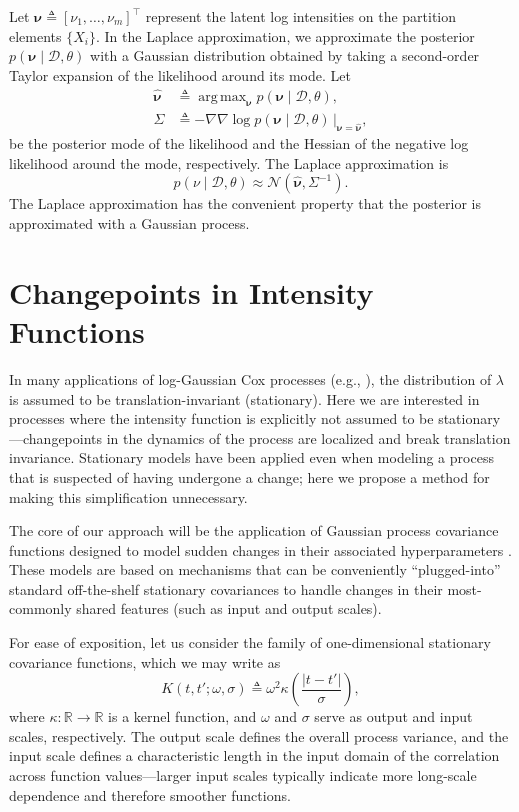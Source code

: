 \documentclass{article}
\newcommand{\deq}{\triangleq}
\newcommand{\cm}[1]{\mathcal{#1}}
\newcommand{\data}{\cm{D}}
\newcommand{\given}{\mid}
\newcommand{\R}{\mathbb{R}}
\DeclareMathOperator*{\argmax}{arg\,max}
\begin{document}
Let $\bm{\nu} \deq [\nu_1, \dotsc, \nu_m]^\top$ represent the latent
log intensities on the partition elements $\lbrace X_i \rbrace$.  In
the Laplace approximation, we approximate the posterior $p(\bm{\nu}
\given \data, \theta)$ with a Gaussian distribution obtained by taking
a second-order Taylor expansion of the likelihood around its mode.
Let
\begin{align*}
  \hat{\bm{\nu}}
  &\deq 
  \argmax_{\bm{\nu}} p(\bm{\nu} \given \data, \theta), \\
  \Sigma 
  &\deq 
  -\nabla\nabla \log p(\bm{\nu} \given \data, \theta)
  \,
  \Bigr\rvert_{\bm{\nu} = \hat{\bm{\nu}}},
\end{align*}
be the posterior mode of the likelihood and the Hessian of the
negative log likelihood around the mode, respectively.  The Laplace
approximation is 
\begin{equation*}
  p(\nu \given \data, \theta) 
  \approx
  \cm{N}(\hat{\bm{\nu}}, \Sigma^{-1}).
\end{equation*}
The Laplace approximation has the convenient property that the
posterior is approximated with a Gaussian process.

\section{Changepoints in Intensity Functions}
\label{changepoints}

In many applications of log-Gaussian Cox processes (e.g.,
\citep{moller, diggle, adams}), the distribution of $\lambda$ is
assumed to be translation-invariant (stationary).  Here we are
interested in processes where the intensity function is explicitly not
assumed to be stationary---changepoints in the dynamics of the process
are localized and break translation invariance.  Stationary models
have been applied \citep{adams} even when modeling a process that is
suspected of having undergone a change; here we propose a method for
making this simplification unnecessary.

The core of our approach will be the application of Gaussian process
covariance functions designed to model sudden changes in their
associated hyperparameters \citep{cpcj}.  These models are based on
mechanisms that can be conveniently ``plugged-into'' standard
off-the-shelf stationary covariances to handle changes in their
most-commonly shared features (such as input and output scales).

For ease of exposition, let us consider the family of one-dimensional
stationary covariance functions, which we may write as
\begin{equation*}
  K(t, t'; \omega, \sigma)
  \deq
  \omega^2
  \kappa\left( \frac{\lvert t - t' \rvert}{\sigma} \right),
\end{equation*}
where $\kappa\colon \R \to \R$ is a kernel function, and $\omega$ and
$\sigma$ serve as output and input scales, respectively.  The output
scale defines the overall process variance, and the input scale
defines a characteristic length in the input domain of the correlation
across function values---larger input scales typically indicate more
long-scale dependence and therefore smoother functions.
\end{document}
